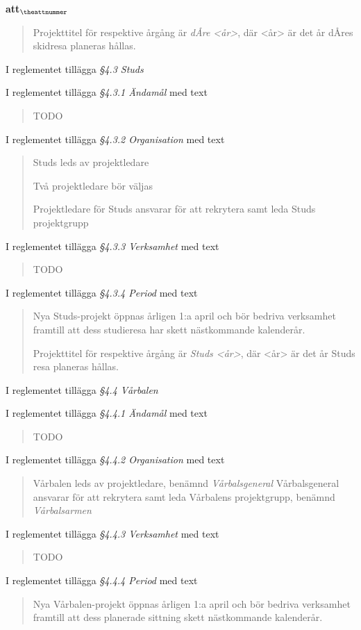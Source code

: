 \documentclass[a4paper]{article}
\begin{document}
\begin{list}{\bf att$_{\theattnummer}$}{}
\begin{quote}
        Projekttitel för respektive årgång är \textit{dÅre <år>}, där <år> är det år dÅres skidresa planeras hållas.
    \end{quote}


\item I reglementet tillägga \textit{\S4.3 Studs}
\item I reglementet tillägga \textit{\S4.3.1 Ändamål} med text \begin{quote} TODO \end{quote}
\item I reglementet tillägga \textit{\S4.3.2 Organisation} med text
    \begin{quote}
        Studs leds av projektledare

        Två projektledare bör väljas

        Projektledare för Studs ansvarar för att rekrytera samt leda Studs projektgrupp
    \end{quote}
\item I reglementet tillägga \textit{\S4.3.3 Verksamhet} med text
    \begin{quote}
        TODO
    \end{quote}
\item I reglementet tillägga \textit{\S4.3.4 Period} med text
    \begin{quote}
        Nya Studs-projekt öppnas årligen 1:a april och bör bedriva verksamhet framtill att dess studieresa har skett nästkommande kalenderår.

        Projekttitel för respektive årgång är \textit{Studs <år>}, där <år> är det år Studs resa planeras hållas.
    \end{quote}


\item I reglementet tillägga \textit{\S4.4 Vårbalen}
\item I reglementet tillägga \textit{\S4.4.1 Ändamål} med text
    \begin{quote}
        TODO
    \end{quote}
\item I reglementet tillägga \textit{\S4.4.2 Organisation} med text
    \begin{quote} Vårbalen leds av projektledare, benämnd \textit{Vårbalsgeneral}
        Vårbalsgeneral ansvarar för att rekrytera samt leda Vårbalens projektgrupp, benämnd \textit{Vårbalsarmen}
    \end{quote}
\item I reglementet tillägga \textit{\S4.4.3 Verksamhet} med text
    \begin{quote}
        TODO
    \end{quote}
\item I reglementet tillägga \textit{\S4.4.4 Period} med text
    \begin{quote}
        Nya Vårbalen-projekt öppnas årligen 1:a april och bör bedriva verksamhet framtill att dess planerade sittning skett nästkommande kalenderår.
        

\end{quote}
\end{list}
\end{document}
